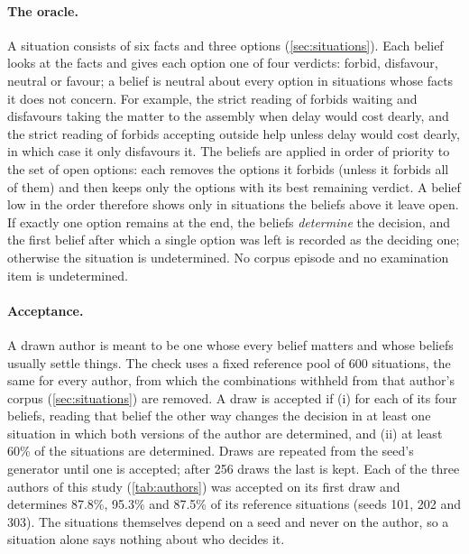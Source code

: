 \paragraph{The oracle.}
A situation consists of six facts and three options (\cref{sec:situations}). Each belief
looks at the facts and gives each option one of four verdicts: forbid, disfavour, neutral or
favour; a belief is neutral about every option in situations whose facts it does not
concern. For example, the strict reading of  forbids waiting and disfavours taking
the matter to the assembly when delay would cost dearly, and the strict reading of
 forbids accepting outside help unless delay would cost dearly, in which
case it only disfavours it. The beliefs are applied in order of priority to the set of open
options: each removes the options it forbids (unless it forbids all of them) and then keeps
only the options with its best remaining verdict. A belief low in the order therefore shows
only in situations the beliefs above it leave open. If exactly one option remains at the end,
the beliefs \emph{determine} the decision, and the first belief after which a single option
was left is recorded as the deciding one; otherwise the situation is undetermined. No corpus
episode and no examination item is undetermined.

\paragraph{Acceptance.}
A drawn author is meant to be one whose every belief matters and whose beliefs usually settle
things. The check uses a fixed reference pool of 600 situations, the same for every author,
from which the combinations withheld from that author's corpus (\cref{sec:situations}) are
removed. A draw is accepted if (i) for each of its four beliefs, reading that belief the other
way changes the decision in at least one situation in which both versions of the author are
determined, and (ii) at least 60\% of the situations are determined. Draws are repeated from
the seed's generator until one is accepted; after 256 draws the last is kept. Each of the
three authors of this study (\cref{tab:authors}) was accepted on its first draw and determines
87.8\%, 95.3\% and 87.5\% of its reference situations (seeds 101, 202 and 303). The situations
themselves depend on a seed and never on the author, so a situation alone says nothing about
who decides it.

\begin{table}[t]
\centering\small

\caption{The three authors, with their beliefs in order of priority as the generator draws
them and as the corpus directory records them.}
\label{tab:authors}
\end{table}

